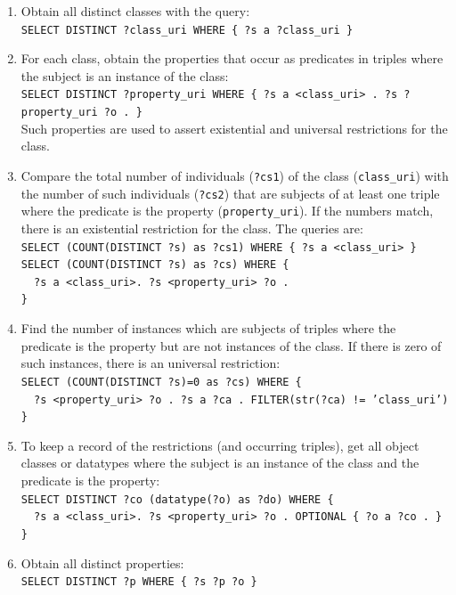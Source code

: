 \documentclass[review]{elsarticle}
\newcommand{\textttt}[1] {\texttt{\footnotesize#1}}
\newcommand{\h} {\hphantom ~ }
\begin{document}
\begin{enumerate}[leftmargin=0cm]
    \item Obtain all distinct classes with the query:\\
        \textttt{SELECT DISTINCT ?class\_uri WHERE \{ ?s a ?class\_uri \}}
\item For each class, obtain the properties that occur as predicates in triples where the subject is an instance of the class:\\
	\textttt{SELECT DISTINCT ?property\_uri WHERE \{ ?s a <class\_uri> . ?s ?property\_uri ?o . \}}\\
Such properties are used to assert existential and universal restrictions for the class.
\item Compare the total number of individuals (\textttt{?cs1}) of the class (\textttt{class\_uri}) with
	the number of such individuals (\textttt{?cs2}) that are subjects of at least one triple where 
	the predicate is the property (\textttt{property\_uri}).
	If the numbers match, there is an existential restriction for the class. The queries are:\\
	\textttt{SELECT (COUNT(DISTINCT ?s) as ?cs1) WHERE \{ ?s a <class\_uri> \}}\\
	\textttt{SELECT (COUNT(DISTINCT ?s) as ?cs) WHERE \{\\
	\h ?s a <class\_uri>. ?s <property\_uri> ?o .\\ \}}
\item Find the number of instances which are subjects of triples where the predicate is the property but are not instances of the class.
	If there is zero of such instances, there is an universal restriction:\\
	\textttt{SELECT (COUNT(DISTINCT ?s)=0 as ?cs) WHERE \{\\
	\h ?s <property\_uri> ?o . ?s a ?ca . FILTER(str(?ca) != 'class\_uri')\\ \}}
\item To keep a record of the restrictions (and occurring triples), get all object classes or datatypes where the subject is an instance of the class and the predicate is the property:\\
	\textttt{SELECT DISTINCT ?co (datatype(?o) as ?do) WHERE \{\\
		\h ?s a <class\_uri>. ?s <property\_uri> ?o . OPTIONAL \{ ?o a ?co . \}\\
\}}
    \item Obtain all distinct properties:\\
        \textttt{SELECT DISTINCT ?p WHERE \{ ?s ?p ?o \}}

\end{enumerate}
\end{document}

